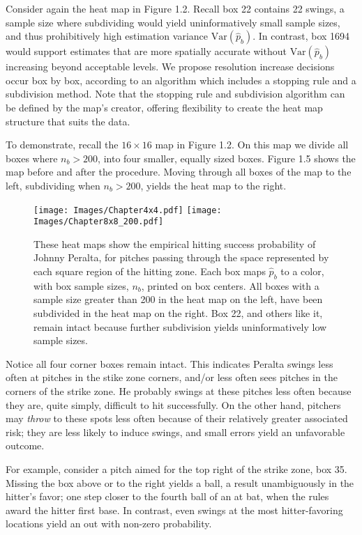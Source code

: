 Consider again the heat map in Figure 1.2. Recall box 22 contains 22 swings, a sample size where subdividing would yield uninformatively small sample sizes, and thus prohibitively high estimation variance $\text{Var}(\hat{p}_{b})$. In contrast, box 1694 would support estimates that are more spatially accurate without $\text{Var}(\hat{p}_{b})$ increasing beyond acceptable levels. We propose resolution increase decisions occur box by box, according to an algorithm which includes a stopping rule and a subdivision method. Note that the stopping rule and subdivision algorithm can be defined by the map's creator, offering flexibility to create the heat map structure that suits the data. 

To demonstrate, recall the $16 \times 16$ map in Figure 1.2. On this map we divide all boxes where $n_{b} > 200$, into four smaller, equally sized boxes. Figure 1.5 shows the map before and after the procedure. Moving through all boxes of the map to the left, subdividing when $n_{b} > 200$, yields the heat map to the right.
        \begin{figure}[H]
      	\centering
      	\texttt{[image: Images/Chapter4x4.pdf]} 
      	\texttt{[image: Images/Chapter8x8\_200.pdf]} 
      	\caption{These heat maps show the empirical hitting success probability of Johnny Peralta, for pitches passing through the space represented by each square region of the hitting zone.  Each box maps $\hat{p}_{b}$ to a color, with box sample sizes, $n_{b}$, printed on box centers. All boxes with a sample size greater than 200 in the heat map on the left, have been subdivided in the heat map on the right. Box 22, and others like it, remain intact because further subdivision yields uninformatively low sample sizes.}
      	\end{figure} 
      	
Notice all four corner boxes remain intact. This indicates Peralta  swings less often at pitches in the stike zone corners, and/or less often sees pitches in the corners of the strike zone. He probably swings at these pitches less often because they are, quite simply, difficult to hit successfully. On the other hand, pitchers may {\it throw} to these spots less often because of their relatively greater associated risk; they are less likely to induce swings, and small errors yield an unfavorable outcome. 

For example, consider a pitch aimed for the top right of the strike zone, box 35. Missing the box above or to the right yields a ball, a result unambiguously in the hitter's favor; one step closer to the fourth ball of an at bat, when the rules award the hitter first base. In contrast, even swings at the most hitter-favoring locations yield an out with non-zero probability.

